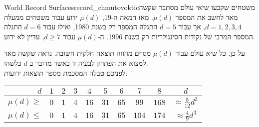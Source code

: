 \begin{surferIntroPage}{World Record Surfaces}{record_chmutovoktic}{משטחים שקבעו שיאי עולם}
 מסתבר שקשה מאד לחשב את המספר $\mu(d)$.
    מאז המאה ה-$19$, $\mu(d)$ ידוע עבור משטחים ממעלה $d=1,2,3,4$, אך עבור $d=5$
    התגלה המספר רק בשנת 1980, ואילו עבור $d=6$ התגלה המספר המרבי של נקודות הסינגולריות רק בשנת 1996.
    ה-$\mu(d)$ עבור $d\ge 7$, עדיין לא ידוע.
  
    על כן, כל שיא עולם עבור $\mu(d)$ מסוים מהווה תוצאה חלקית חשובה. נראה שקשה מאד למצוא את הפתרון לבעיה זו כאשר מדובר ב-$d$ כלשהו.\\  לפניכם טבלה המסכמת מספר תוצאות ידועות:
    
   \begin{center}
      \begin{tabular}{r|cccccccc|c}
        $d$ & $1$ & $2$ & $3$ & $4$ & $5$ & $6$ & $7$ & $8$ & $d$\\
        \hline
        \hline
        \rule{0pt}{1.2em}$\mu(d)\ge$ & $0$ & $1$ & $4$ & $16$ & $31$ & $65$ &
        $99$ & $168$ & 
        $\approx \frac{5}{12}d^3$\\[0.3em]
        \hline
        \rule{0pt}{1.2em}$\mu(d)\le$ & $0$ & $1$ & $4$ & $16$ & $31$ & $65$ &
        $104$ & $174$ & $\approx \frac{4}{9}d^3$
      \end{tabular}
    \end{center}
\end{surferIntroPage}
